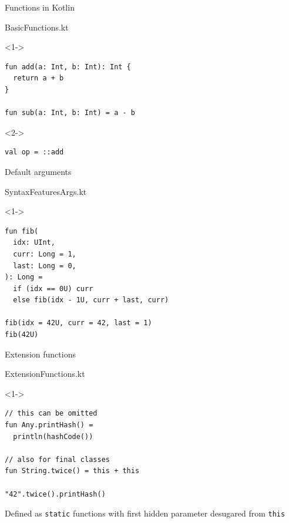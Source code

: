 \documentclass[hyperref={pdfpagelabels=false},xcolor={dvipsnames},compress]{beamer}
\begin{document}
    \begin{frame}[fragile]{Functions in Kotlin}
        \begin{exampleblock}{BasicFunctions.kt}
            \begin{onlyenv}<1->
                \begin{lstlisting}
fun add(a: Int, b: Int): Int {
  return a + b
}

fun sub(a: Int, b: Int) = a - b
                \end{lstlisting}
            \end{onlyenv}
            \begin{onlyenv}<2->
                \begin{lstlisting}
val op = ::add
                \end{lstlisting}
            \end{onlyenv}
        \end{exampleblock}
    \end{frame}

    \begin{frame}[fragile]{Default arguments}
        \begin{exampleblock}{SyntaxFeaturesArgs.kt}
            \begin{onlyenv}<1->
                \begin{lstlisting}
fun fib(
  idx: UInt,
  curr: Long = 1,
  last: Long = 0,
): Long =
  if (idx == 0U) curr
  else fib(idx - 1U, curr + last, curr)

fib(idx = 42U, curr = 42, last = 1)
fib(42U)
                \end{lstlisting}
            \end{onlyenv}
        \end{exampleblock}
    \end{frame}

    \begin{frame}[fragile]{Extension functions}
        \begin{exampleblock}{ExtensionFunctions.kt}
            \begin{onlyenv}<1->
                \begin{lstlisting}
// this can be omitted
fun Any.printHash() =
  println(hashCode())

// also for final classes
fun String.twice() = this + this

"42".twice().printHash()
                \end{lstlisting}
            \end{onlyenv}
        \end{exampleblock}
        Defined as \texttt{static} functions with first hidden parameter desugared from \texttt{this}
    \end{frame}
\end{document}
